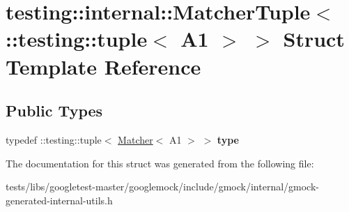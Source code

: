 \hypertarget{structtesting_1_1internal_1_1MatcherTuple_3_01_1_1testing_1_1tuple_3_01A1_01_4_01_4}{}\section{testing\+:\+:internal\+:\+:Matcher\+Tuple$<$ \+:\+:testing\+:\+:tuple$<$ A1 $>$ $>$ Struct Template Reference}
\label{structtesting_1_1internal_1_1MatcherTuple_3_01_1_1testing_1_1tuple_3_01A1_01_4_01_4}
\subsection*{Public Types}
\begin{DoxyCompactItemize}
\item 
\mbox{\label{structtesting_1_1internal_1_1MatcherTuple_3_01_1_1testing_1_1tuple_3_01A1_01_4_01_4_a8463ac100366f7e8b6ad1035e42ec4b0}} 
typedef \+::testing\+::tuple$<$ \hyperlink{classtesting_1_1Matcher}{Matcher}$<$ A1 $>$ $>$ {\bfseries type}
\end{DoxyCompactItemize}


The documentation for this struct was generated from the following file\+:\begin{DoxyCompactItemize}
\item 
tests/libs/googletest-\/master/googlemock/include/gmock/internal/gmock-\/generated-\/internal-\/utils.\+h\end{DoxyCompactItemize}
